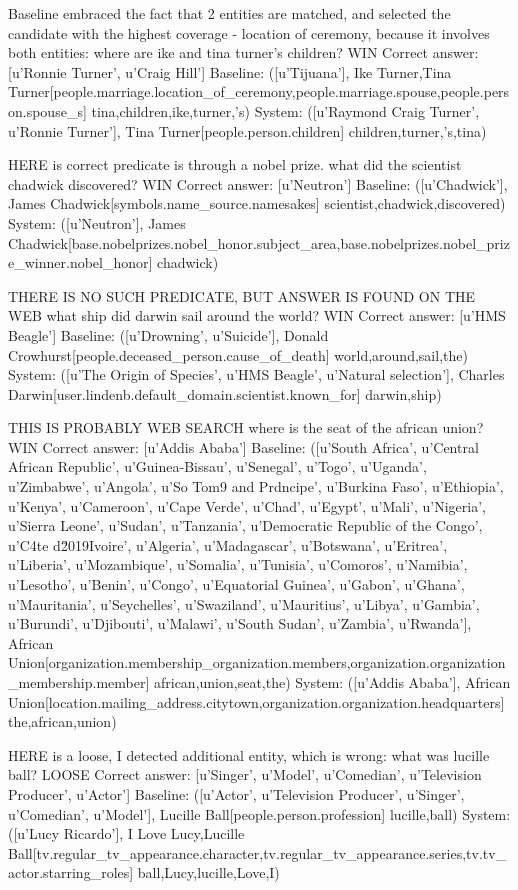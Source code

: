Baseline embraced the fact that 2 entities are matched, and selected the candidate with the highest coverage - location of ceremony, because it involves both entities:
where are ike and tina turner's children? WIN
Correct answer:  [u'Ronnie Turner', u'Craig Hill']
Baseline:  ([u'Tijuana'], Ike Turner,Tina Turner[people.marriage.location\_of\_ceremony,people.marriage.spouse,people.person.spouse\_s] tina,children,ike,turner,'s)
System:  ([u'Raymond Craig Turner', u'Ronnie Turner'], Tina Turner[people.person.children] children,turner,'s,tina)

HERE is correct predicate is through a nobel prize.
what did the scientist chadwick discovered? WIN
Correct answer:  [u'Neutron']
Baseline:  ([u'Chadwick'], James Chadwick[symbols.name\_source.namesakes] scientist,chadwick,discovered)
System:  ([u'Neutron'], James Chadwick[base.nobelprizes.nobel\_honor.subject\_area,base.nobelprizes.nobel\_prize\_winner.nobel\_honor] chadwick)

THERE IS NO SUCH PREDICATE, BUT ANSWER IS FOUND ON THE WEB
what ship did darwin sail around the world? WIN
Correct answer:  [u'HMS Beagle']
Baseline:  ([u'Drowning', u'Suicide'], Donald Crowhurst[people.deceased\_person.cause\_of\_death] world,around,sail,the)
System:  ([u'The Origin of Species', u'HMS Beagle', u'Natural selection'], Charles Darwin[user.lindenb.default\_domain.scientist.known\_for] darwin,ship)

THIS IS PROBABLY WEB SEARCH
where is the seat of the african union? WIN
Correct answer:  [u'Addis Ababa']
Baseline:  ([u'South Africa', u'Central African Republic', u'Guinea-Bissau', u'Senegal', u'Togo', u'Uganda', u'Zimbabwe', u'Angola', u'So Tom9 and Prdncipe', u'Burkina Faso', u'Ethiopia', u'Kenya', u'Cameroon', u'Cape Verde', u'Chad', u'Egypt', u'Mali', u'Nigeria', u'Sierra Leone', u'Sudan', u'Tanzania', u'Democratic Republic of the Congo', u'C4te d\u2019Ivoire', u'Algeria', u'Madagascar', u'Botswana', u'Eritrea', u'Liberia', u'Mozambique', u'Somalia', u'Tunisia', u'Comoros', u'Namibia', u'Lesotho', u'Benin', u'Congo', u'Equatorial Guinea', u'Gabon', u'Ghana', u'Mauritania', u'Seychelles', u'Swaziland', u'Mauritius', u'Libya', u'Gambia', u'Burundi', u'Djibouti', u'Malawi', u'South Sudan', u'Zambia', u'Rwanda'], African Union[organization.membership\_organization.members,organization.organization\_membership.member] african,union,seat,the)
System:  ([u'Addis Ababa'], African Union[location.mailing\_address.citytown,organization.organization.headquarters] the,african,union)


HERE is a loose, I detected additional entity, which is wrong:
what was lucille ball? LOOSE
Correct answer:  [u'Singer', u'Model', u'Comedian', u'Television Producer', u'Actor']
Baseline:  ([u'Actor', u'Television Producer', u'Singer', u'Comedian', u'Model'], Lucille Ball[people.person.profession] lucille,ball)
System:  ([u'Lucy Ricardo'], I Love Lucy,Lucille Ball[tv.regular\_tv\_appearance.character,tv.regular\_tv\_appearance.series,tv.tv\_actor.starring\_roles] ball,Lucy,lucille,Love,I)


